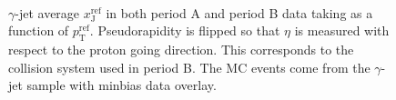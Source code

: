 \documentclass[NOTE, atlasdraft=true, texlive=2016, USenglish]{\ATLASLATEXPATH atlasdoc}
\begin{document}
\begin{figure}[htbp]
{	}
	 \\
	\caption{$\gamma$-jet average $x_{\text{J}}^{\text{ref}}$ in both period A and period B data taking as a function of $p_{\text{T}}^{\text{ref}}$. Pseudorapidity is flipped so that $\eta$ is measured with respect to the proton going direction. This corresponds to the collision system used in period B. The MC events come from the $\gamma$-jet sample with minbias data overlay.}
	\label{fig:xjgammaPABDO}
\end{figure}
\end{document}
